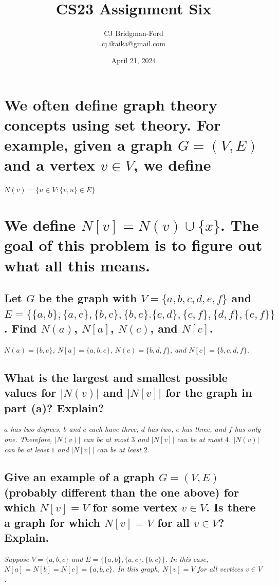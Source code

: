 \documentclass{article}
\title{CS23 Assignment Six}
\author{CJ Bridgman-Ford \\ cj.ikaika@gmail.com}
\date{April 21, 2024}
\begin{document}
\maketitle
\thispagestyle{empty}

\clearpage


\section{We often define graph theory concepts using set theory. For example, given a graph $G=(V,E)$ and a vertex $v \in V$, we define}
\begin{center}
    $N(v) = \{u \in V : \{v,u\}\in E\}$
\end{center}
\section*{\hspace{1cm}We define $N[v]=N(v)\cup\{x\}$. The goal of this problem is to figure out what all this means.}
\subsection{Let $G$ be the graph with $V=\{a,b,c,d,e,f\}$ and $E=\{\{a,b\},\{a,e\},\{b,c\},\{b,e\}.\{c,d\},\{c,f\},\{d,f\},\{e,f\}\}$. Find $N(a)$, $N[a]$, $N(c)$, and $N[c]$.}
\hspace{1cm}\textit{$N(a)=\{b,e\}$, $N[a]=\{a,b,e\}$, $N(c)=\{b,d,f\}$, and $N[c]=\{b,c,d,f\}$.}
\subsection{What is the largest and smallest possible values for $|N(v)|$ and $|N[v]|$ for the graph in part (a)? Explain?}
\hspace{1cm}\textit{$a$ has two degrees, $b$ and $c$ each have three, $d$ has two, $e$ has three, and $f$ has only one. Therefore, $|N(v)|$ can be at most $3$ and $|N[v]|$ can be at most $4$. $|N(v)|$ can be at least $1$ and $|N[v]|$ can be at least $2$.}
\subsection{Give an example of a graph $G=(V,E)$ (probably different than the one above) for which $N[v]=V$ for some vertex $v\in V$. Is there a graph for which $N[v]=V$ for all $v \in V$? Explain.}
\hspace{1cm}\textit{Suppose $V = \{a,b,c\}$ and $E = \{\{a,b\},\{a,c\},\{b,c\}\}$. In this case, $N[a]=N[b]=N[c]=\{a,b,c\}$. In this graph, $N[v]=V$ for all vertices $v\in V$.}
\end{document}
